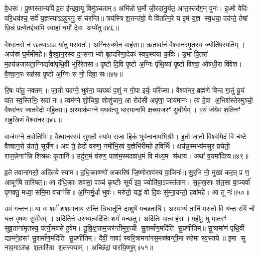वे॒धसः॑। पू॒ष्णस्तान्यपि॑ व्र॒त इ॑न्द्रवा॒यू विमु॑ञ्चताम्॥ अभि॑न्नो घ॒र्मो जी॒रदा॑नु॒र्यत॒ आत्त॒स्तद॑ग॒न् पुनः॑। इ॒ध्मो वेदिः॑ परि॒धय॑श्च॒ सर्वे॑ य॒ज्ञस्याऽऽयु॒रनु॒ सं च॑रन्ति॥ त्रय॑स्त्रिश॒त्तन्त॑वो॒ ये वि॑तत्नि॒रे य इ॒मं य॒ज्ञ स्व॒धया॒ दद॑न्ते॒ तेषां छि॒न्नं प्रत्ये॒तद्द॑धामि॒ स्वाहा॑ घ॒र्मो दे॒वा अप्ये॑तु॥४६॥

{\anuvakamend[{अषा॑ढ॒ ओष॑धय उपचि॒न्वन्ति॒ पञ्च॑चत्वारिशच्च॥10॥}]}

वै॒श्वा॒न॒रो न॑ ऊ॒त्याऽऽप्र या॑तु परा॒वतः॑। अ॒ग्निरु॒क्थेन॒ वाह॑सा॥ ऋ॒तावा॑नं वैश्वान॒रमृ॒तस्य॒ ज्योति॑ष॒स्पतिम्। अज॑स्रं घ॒र्ममी॑महे॥ वै॒श्वा॒न॒रस्य॑ द॒ꣳ॒सनाभ्यो बृ॒हदरि॑णा॒देकः॑ स्वप॒स्य॑या क॒विः। उ॒भा पि॒तरा॑ म॒हय॑न्नजायता॒ग्निर्द्यावा॑पृथि॒वी भूरि॑रेतसा॥ पृ॒ष्टो दि॒वि पृ॒ष्टो अ॒ग्निः पृ॑थि॒व्यां पृ॒ष्टो विश्वा॒ ओष॑धी॒रा वि॑वेश। वै॒श्वा॒न॒रः सह॑सा पृ॒ष्टो अ॒ग्निः स नो॒ दिवा॒ सः॥४७॥

रि॒षः पा॑तु॒ नक्तम्॥ जा॒तो यद॑ग्ने॒ भुव॑ना॒ व्यख्यः॑ प॒शुं न गो॒पा इर्यः॒ परि॑ज्मा। वैश्वा॑नर॒ ब्रह्म॑णे विन्द गा॒तुं यू॒यं पा॑त स्व॒स्तिभिः॒ सदा॑ नः॥ त्वम॑ग्ने शो॒चिषा॒ शोशु॑चान॒ आ रोद॑सी अपृणा॒ जाय॑मानः। त्वं दे॒वा अ॒भिश॑स्तेरमुञ्चो॒ वैश्वा॑नर जातवेदो महि॒त्वा॥ अ॒स्माक॑मग्ने म॒घव॑त्सु धार॒याना॑मि क्ष॒त्त्रम॒जरꣳ॑ सु॒वीर्यम्। व॒यं ज॑येम श॒तिनꣳ॑ सह॒स्रिणं॒ वैश्वा॑नर॥४८॥

वाज॑मग्ने॒ तवो॒तिभिः॑॥ वै॒श्वा॒न॒रस्य॑ सुम॒तौ स्या॑म॒ राजा॒ हिकं॒ भुव॑नानामभि॒श्रीः। इ॒तो जा॒तो विश्व॑मि॒दं वि च॑ष्टे वैश्वान॒रो य॑तते॒ सूर्ये॑ण॥ अव॑ ते॒ हेडो॑ वरुण॒ नमो॑भि॒रव॑ य॒ज्ञेभि॑रीमहे ह॒विर्भिः॑। क्षय॑न्न॒स्मभ्य॑मसुर प्रचेतो॒ राज॒न्नेनाꣳ॑सि शिश्रथः कृ॒तानि॑॥ उदु॑त्त॒मं व॑रुण॒ पाश॑म॒स्मदवा॑ध॒मं वि म॑ध्य॒म श्र॑थाय। अथा॑ व॒यमा॑दित्य॥४९॥

व्र॒ते तवाना॑गसो॒ अदि॑तये स्याम॥ द॒धि॒क्राव्ण्णो॑ अकारिषं जि॒ष्णोरश्व॑स्य वा॒जिनः॑॥ सु॒र॒भि नो॒ मुखा॑ कर॒त् प्र ण॒ आयूꣳ॑षि तारिषत्॥ आ द॑धि॒क्राः शव॑सा॒ पञ्च॑ कृ॒ष्टीः सूर्य॑ इव॒ ज्योति॑षा॒ऽपस्त॑तान। स॒ह॒स्र॒साः श॑त॒सा वा॒ज्यर्वा॑ पृ॒णक्तु॒ मध्वा॒ समि॒मा वचाꣳ॑सि॥ अ॒ग्निर्मू॒र्धा भुवः॑। मरु॑तो॒ यद्ध॑ वो दि॒वः सु॑म्ना॒यन्तो॒ हवा॑महे। आ तू नः॑॥५०॥

उप॑ गन्तन॥ या वः॒ शर्म॑ शशमा॒नाय॒ सन्ति॑ त्रि॒धातू॑नि दा॒शुषे॑ यच्छ॒ताधि॑। अ॒स्मभ्यं॒ तानि॑ मरुतो॒ वि य॑न्त र॒यिं नो॑ धत्त वृषणः सु॒वीरम्॥ अदि॑तिर्न उरुष्य॒त्वदि॑तिः॒ शर्म॑ यच्छतु। अदि॑तिः पा॒त्वह॑सः॥ म॒हीमू॒ षु मा॒तरꣳ॑ सुव्र॒ताना॑मृ॒तस्य॒ पत्नी॒मव॑से हुवेम। तु॒वि॒क्ष॒त्त्राम॒जर॑न्तीमुरू॒ची सु॒शर्मा॑ण॒मदि॑ति सु॒प्रणी॑तिम्॥ सु॒त्रामा॑णं पृथि॒वीं द्याम॑ने॒हसꣳ॑ सु॒शर्मा॑ण॒मदि॑ति सु॒प्रणी॑तिम्। दैवीं॒ नावꣵ॑ स्वरि॒त्रामना॑गस॒मस्र॑वन्ती॒मा रु॑हेमा स्व॒स्तये॥ इ॒मा सु नाव॒माऽरु॑ह श॒तारि॑त्रा श॒तस्फ्याम्। अच्छि॑द्रां पारयि॒ष्णुम्॥५१॥


